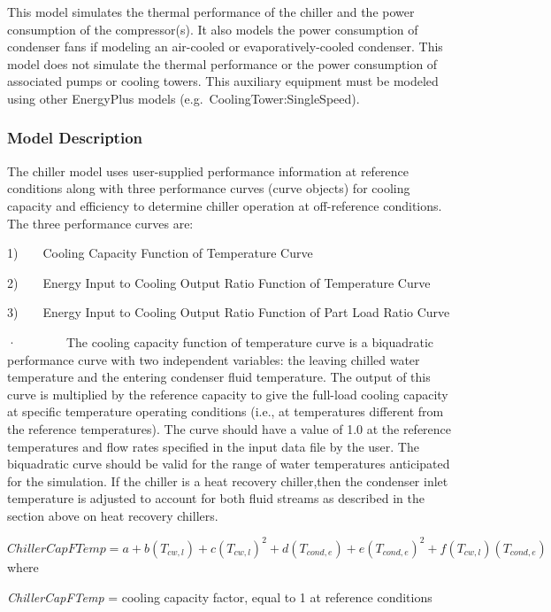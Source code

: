 This model simulates the thermal performance of the chiller and the power consumption of the compressor(s). It also models the power consumption of condenser fans if modeling an air-cooled or evaporatively-cooled condenser. This model does not simulate the thermal performance or the power consumption of associated pumps or cooling towers. This auxiliary equipment must be modeled using other EnergyPlus models (e.g.~CoolingTower:SingleSpeed).

\subsubsection{Model Description}\label{model-description-2-003}

The chiller model uses user-supplied performance information at reference conditions along with three performance curves (curve objects) for cooling capacity and efficiency to determine chiller operation at off-reference conditions. The three performance curves are:

1)~~~~Cooling Capacity Function of Temperature Curve

2)~~~~Energy Input to Cooling Output Ratio Function of Temperature Curve

3)~~~~Energy Input to Cooling Output Ratio Function of Part Load Ratio Curve

·~~~~~~~~The cooling capacity function of temperature curve is a biquadratic performance curve with two independent variables: the leaving chilled water temperature and the entering condenser fluid temperature. The output of this curve is multiplied by the reference capacity to give the full-load cooling capacity at specific temperature operating conditions (i.e., at temperatures different from the reference temperatures). The curve should have a value of 1.0 at the reference temperatures and flow rates specified in the input data file by the user. The biquadratic curve should be valid for the range of water temperatures anticipated for the simulation. If the chiller is a heat recovery chiller,then the condenser inlet temperature is adjusted to account for both fluid streams as described in the section above on heat recovery chillers.

\(ChillerCapFTemp = a + b\left( {{T_{cw,l}}} \right) + c{\left( {{T_{cw,l}}} \right)^2} + d\left( {{T_{cond,e}}} \right) + e{\left( {{T_{cond,e}}} \right)^2} + f\left( {{T_{cw,l}}} \right)\left( {{T_{cond,e}}} \right)\) where

\emph{ChillerCapFTemp} = cooling capacity factor, equal to 1 at reference conditions

